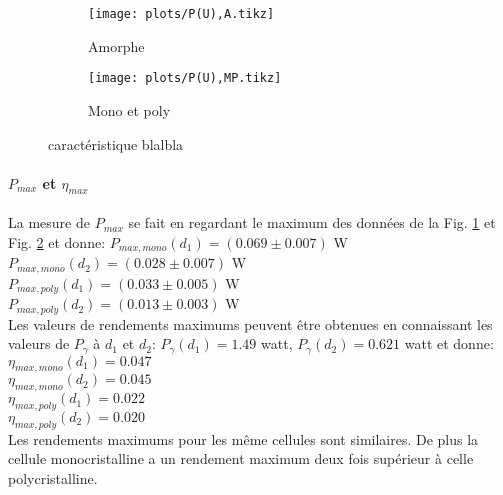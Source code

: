 \begin{figure}
    \centering
    \begin{subfigure}[c]{0.4\linewidth}
        \centering
        \texttt{[image: plots/P(U),A.tikz]}
        \caption{Amorphe}
        \label{plot:3a}        
    \end{subfigure}
    \begin{subfigure}[c]{0.4\linewidth}
        \centering
        \texttt{[image: plots/P(U),MP.tikz]}
        \caption{Mono et poly}
        \label{plot:3b}        
    \end{subfigure}
    \caption{caractéristique blalbla}
    \label{plot:3}
\end{figure}

\paragraph*{\(P_{max}\) et \(\eta_{max}\)}
La mesure de \(P_{max}\) se fait en regardant le maximum des données de la Fig. \ref{plot:3a} et Fig. \ref{plot:3b} et donne: 
\(P_{max,mono} (d_1) =  (0.069 \pm 0.007)\) \unit{\watt} \\
\(P_{max,mono} (d_2) =  (0.028 \pm 0.007)\) \unit{\watt} \\
\(P_{max,poly} (d_1) =  (0.033 \pm 0.005)\) \unit{\watt} \\
\(P_{max,poly} (d_2) =  (0.013 \pm 0.003)\) \unit{\watt} \\
Les valeurs de rendements maximums peuvent être obtenues en connaissant les valeurs de \(P_\gamma\) à \(d_1\) et \(d_2\): \(P_\gamma (d_1) = 1.49\) \unit{watt}, \(P_\gamma (d_2) = 0.621\) \unit{watt} et donne:
\(\eta_{max,mono} (d_1) =  0.047\) \\
\(\eta_{max,mono} (d_2) =  0.045\) \\
\(\eta_{max,poly} (d_1) =  0.022\) \\
\(\eta_{max,poly} (d_2) =  0.020\) \\
Les rendements maximums pour les même cellules sont similaires. De plus la cellule monocristalline a un rendement maximum deux fois supérieur à celle polycristalline.

